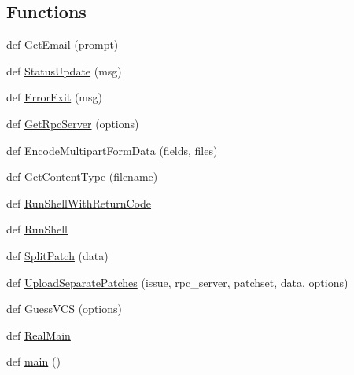 \subsection*{Functions}
\begin{DoxyCompactItemize}
\item 
def \hyperlink{namespaceupload_a5d38be419531db48619dd15895bb67b7}{Get\+Email} (prompt)
\item 
def \hyperlink{namespaceupload_ae1674a40fdaa1839c11d66e3ba377138}{Status\+Update} (msg)
\item 
def \hyperlink{namespaceupload_a62a45286d011ff9bc7b679df11b76782}{Error\+Exit} (msg)
\item 
def \hyperlink{namespaceupload_addd6526452ebad88b42feca6af5ba49e}{Get\+Rpc\+Server} (options)
\item 
def \hyperlink{namespaceupload_a8c5b852d69edf142bee8a9eada1bd3dd}{Encode\+Multipart\+Form\+Data} (fields, files)
\item 
def \hyperlink{namespaceupload_a2569514a52ec5cea9b1e637c00770ab4}{Get\+Content\+Type} (filename)
\item 
def \hyperlink{namespaceupload_ad1411f9f420adfc252e08a739383a935}{Run\+Shell\+With\+Return\+Code}
\item 
def \hyperlink{namespaceupload_a21aed715c06af727c8a004a3d07538aa}{Run\+Shell}
\item 
def \hyperlink{namespaceupload_a904be9e77711330f4d81c2dcaf6f30af}{Split\+Patch} (data)
\item 
def \hyperlink{namespaceupload_ac5434675f0e62750ef604dc2395868e6}{Upload\+Separate\+Patches} (issue, rpc\+\_\+server, patchset, data, options)
\item 
def \hyperlink{namespaceupload_acb0e8edddfef1f8efca706623d9fb11f}{Guess\+V\+C\+S} (options)
\item 
def \hyperlink{namespaceupload_acec50a5988a3b92a044a95b5f044b58a}{Real\+Main}
\item 
def \hyperlink{namespaceupload_a4a0f807918a7bab9916e0a59891b560a}{main} ()
\end{DoxyCompactItemize}
